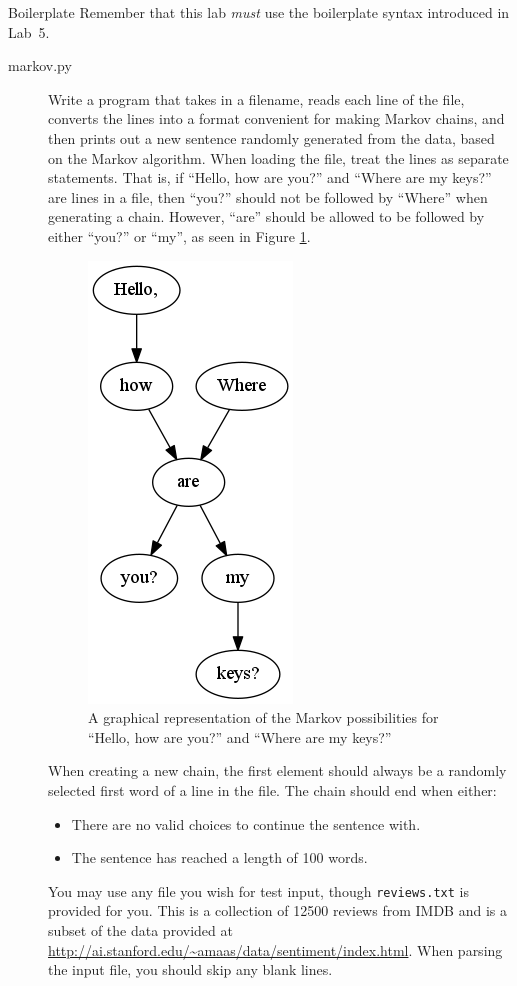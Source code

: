 \documentclass[11pt]{cselabheader}
\begin{document}
\begin{warningbox}{Boilerplate}
  Remember that this lab \emph{must} use the
  boilerplate syntax introduced in Lab~5.
\end{warningbox}

\begin{description}
\item[markov.py] Write a program that takes in a filename, reads each line of the file, converts the lines into a format convenient for making Markov chains, and then prints out a new sentence randomly generated from the data, based on the Markov algorithm. When loading the file, treat the lines as separate statements. That is, if ``Hello, how are you?'' and ``Where are my keys?'' are lines in a file, then ``you?'' should not be followed by ``Where'' when generating a chain. However, ``are'' should be allowed to be followed by either ``you?'' or ``my'', as seen in Figure \ref{mark_ex}.

  \begin{figure}[h]
    \centering
    \includegraphics[width=0.2\linewidth]{lab10/example}
    \caption{A graphical representation of the Markov possibilities for ``Hello, how are you?'' and ``Where are my keys?''}
    \label{mark_ex}
  \end{figure}

  When creating a new chain, the first element should always be a randomly selected first word of a line in the file. The chain should end when either:
  \begin{itemize}
  \item There are no valid choices to continue the sentence with.
  \item The sentence has reached a length of 100 words.
  \end{itemize}

  You may use any file you wish for test input, though \lstinline{reviews.txt} is provided for you. This is a collection of 12500 reviews from IMDB and is a subset of the data provided at \url{http://ai.stanford.edu/~amaas/data/sentiment/index.html}. When parsing the input file, you should skip any blank lines.
  
\end{description}
\end{document}
